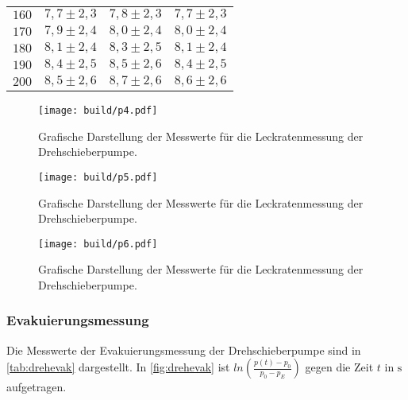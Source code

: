 \begin{table}[H]
\begin{tabular}{c c c c}
    $160$ & $ 7,7 \pm 2,3 $ & $ 7,8 \pm 2,3 $ & $ 7,7 \pm 2,3 $ \\ 
    $170$ & $ 7,9 \pm 2,4 $ & $ 8,0 \pm 2,4 $ & $ 8,0 \pm 2,4 $ \\ 
    $180$ & $ 8,1 \pm 2,4 $ & $ 8,3 \pm 2,5 $ & $ 8,1 \pm 2,4 $ \\ 
    $190$ & $ 8,4 \pm 2,5 $ & $ 8,5 \pm 2,6 $ & $ 8,4 \pm 2,5 $ \\ 
    $200$ & $ 8,5 \pm 2,6 $ & $ 8,7 \pm 2,6 $ & $ 8,6 \pm 2,6 $ \\ 
    \bottomrule
  \end{tabular}
\end{table}

\begin{figure}[H]
  \centering
  \texttt{[image: build/p4.pdf]}
  \caption{Grafische Darstellung der Messwerte für die Leckratenmessung der Drehschieberpumpe.}
  \label{fig:drehleck1}
\end{figure}

\begin{figure}[H]
  \centering
  \texttt{[image: build/p5.pdf]}
  \caption{Grafische Darstellung der Messwerte für die Leckratenmessung der Drehschieberpumpe.}
  \label{fig:drehleck2}
\end{figure}

\begin{figure}[H]
  \centering
  \texttt{[image: build/p6.pdf]}
  \caption{Grafische Darstellung der Messwerte für die Leckratenmessung der Drehschieberpumpe.}
  \label{fig:drehleck3}
\end{figure}

\subsubsection{Evakuierungsmessung}
Die Messwerte der Evakuierungsmessung der Drehschieberpumpe sind in \autoref{tab:drehevak} dargestellt. In
\autoref{fig:drehevak} ist $ln(\frac{p(t)-p_0}{p_0 - p_E})$ gegen die Zeit $t$ in $\si{\second}$ aufgetragen.

